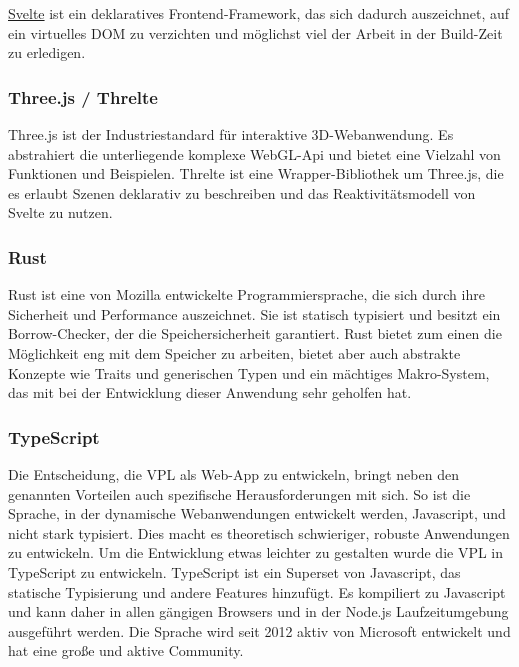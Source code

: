 \documentclass[ngerman]{article}
\begin{document}
\href{https://svelte.dev/}{Svelte} ist ein deklaratives Frontend-Framework, das sich dadurch auszeichnet, auf ein virtuelles DOM zu verzichten und möglichst viel der Arbeit in der Build-Zeit zu erledigen.

\subsubsection{Three.js / Threlte}

Three.js ist der Industriestandard für interaktive 3D-Webanwendung. Es abstrahiert die unterliegende komplexe WebGL-Api und bietet eine Vielzahl von Funktionen und Beispielen. Threlte ist eine Wrapper-Bibliothek um Three.js, die es erlaubt Szenen deklarativ zu beschreiben und das Reaktivitätsmodell von Svelte zu nutzen.

\subsubsection{Rust}
\label{sec:Rust}

Rust ist eine von Mozilla entwickelte Programmiersprache, die sich durch ihre Sicherheit und Performance auszeichnet. Sie ist statisch typisiert und besitzt ein Borrow-Checker, der die Speichersicherheit garantiert. \cite{Jung_2020} Rust bietet zum einen die Möglichkeit eng mit dem Speicher zu arbeiten, bietet aber auch abstrakte Konzepte wie Traits und generischen Typen und ein mächtiges Makro-System, das mit bei der Entwicklung dieser Anwendung sehr geholfen hat.

\subsubsection{TypeScript}
\label{sec:TypeScript}
Die Entscheidung, die VPL als Web-App zu entwickeln, bringt neben den genannten Vorteilen auch spezifische Herausforderungen mit sich.
So ist die Sprache, in der dynamische Webanwendungen entwickelt werden, Javascript,  und nicht stark typisiert. 
Dies macht es theoretisch schwieriger, robuste Anwendungen zu entwickeln. 
Um die Entwicklung etwas leichter zu gestalten wurde die VPL in TypeScript zu entwickeln.
TypeScript ist ein Superset von Javascript, das statische Typisierung und andere Features hinzufügt. Es kompiliert zu Javascript und kann daher in allen gängigen Browsers und in der Node.js Laufzeitumgebung ausgeführt werden. Die Sprache wird seit 2012 aktiv von Microsoft entwickelt und hat eine große und aktive Community.
\end{document}
